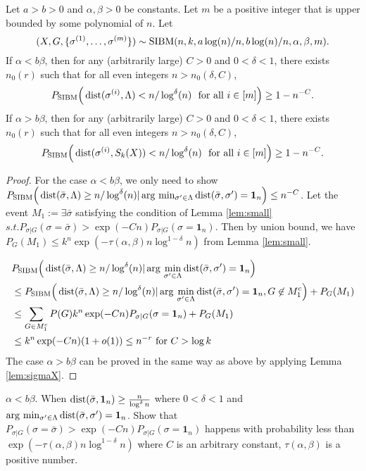 \documentclass{article}
\begin{document}
\begin{proposition} \label{prop:1}
Let $a>b>0$ and $\alpha,\beta>0$ be constants. Let $m$ be a positive integer that is upper bounded by some polynomial of $n$.
Let 
$$
(X,G,\{\sigma^{(1)},\dots,\sigma^{(m)}\})\sim \operatorname{SIBM}(n,k, a\log(n)/n, b\log(n)/n, \alpha,\beta, m) .
$$
If $\alpha < b\beta$, then for any (arbitrarily large) $C>0$ and $0<\delta<1$, there exists $n_0(r)$ such that for all even integers $n>n_0(\delta, C)$,
$$
P_{\operatorname{SIBM}} \Big(\operatorname{dist}(\sigma^{(i)}, \Lambda)< n/\log^{\delta}(n)
\text{~~for all~} i\in[m] \Big) \ge 1- n^{-C} .
$$
If $\alpha > b\beta$, then for any (arbitrarily large) $C>0$ and $0<\delta<1$, there exists $n_0(r)$ such that for all even integers $n>n_0(\delta, C)$,
$$
P_{\operatorname{SIBM}} \Big(\operatorname{dist}(\sigma^{(i)}, S_k(X)) < n/\log^{\delta}(n)
\text{~~for all~} i\in[m] \Big) \ge 1- n^{-C} .
$$
\end{proposition}
\begin{proof}
For the case $\alpha < b \beta$, we only need to show $P_{\operatorname{SIBM}} \Big(\operatorname{dist}(\bar{\sigma}, \Lambda)\geq n/\log^{\delta}(n)
| \arg\,\min_{\sigma'\in \Lambda} \operatorname{dist}(\bar{\sigma}, \sigma') = \mathbf{1}_n
 \Big) \leq n^{-C}$.
 Let the event $M_1:= \exists \bar{\sigma}$ satisfying the condition of Lemma \ref{lem:small}
  $s.t. P_{\sigma | G}(\sigma = \bar{\sigma} ) > \exp(-Cn) P_{\sigma | G}(\sigma = \mathbf{1}_n)$.
 Then by union bound, we have $P_{G}(M_1) \leq k^n\exp(-\tau(\alpha, \beta )n \log^{1-\delta} n )$ from Lemma \ref{lem:small}.
 
\begin{align*}
&P_{\operatorname{SIBM}} \Big(\operatorname{dist}(\bar{\sigma}, \Lambda)\geq n/\log^{\delta}(n)
| \arg\,\min_{\sigma'\in \Lambda} \operatorname{dist}(\bar{\sigma}, \sigma') = \mathbf{1}_n \Big) \\
&\leq
P_{\operatorname{SIBM}} \Big(\operatorname{dist}(\bar{\sigma}, \Lambda)\geq n/\log^{\delta}(n)
| \arg\,\min_{\sigma'\in \Lambda} \operatorname{dist}(\bar{\sigma}, \sigma')= \mathbf{1}_n, G \not\in M_1^c\Big) + P_G(M_1) \\
&\leq \sum_{G \in M_1^c} P(G) k^n \exp(-Cn)P_{\sigma|G}(\sigma=\mathbf{1}_n) + P_G(M_1) \\
& \leq k^n \exp(-Cn) (1 + o(1)) \leq n^{-r} \textrm{ for } C> \log k
\end{align*}
The case $\alpha > b \beta$ can be proved in the same way as above by applying Lemma \ref{lem:sigmaX}.
\end{proof}
\begin{lemma}\label{lem:small}
	$\alpha< b \beta$. When $\operatorname{dist}(\bar{\sigma}, \mathbf{1}_n) \geq \frac{n}{\log^{\delta} n}$ where $0<\delta < 1$ and $\arg\,\min_{\sigma'\in \Lambda} \operatorname{dist}(\bar{\sigma}, \sigma') = \mathbf{1}_n$. Show that
	$P_{\sigma | G}(\sigma = \bar{\sigma} ) > \exp(-Cn) P_{\sigma | G}(\sigma = \mathbf{1}_n)$
	happens with probability less than $\exp(-\tau(\alpha,\beta) n \log^{1-\delta} n )$ where $C$ is an arbitrary constant, $\tau(\alpha,\beta)$ is a positive number.
\end{lemma}
\end{document}
